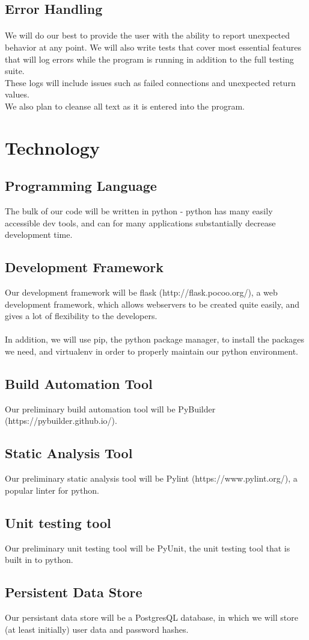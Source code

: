\documentclass{article}
\begin{document}
\subsection{Error Handling}

\paragraph{}

We will do our best to provide the user with the ability to report unexpected behavior at any point. We will also write tests that cover most essential features that will log errors while the program is running in addition to the full testing suite.\\

These logs will include issues such as failed connections and unexpected return values.\\

We also plan to cleanse all text as it is entered into the program.

\newpage
\section{Technology}

\subsection{Programming Language}
The bulk of our code will be written in python - python has many easily accessible dev tools, and can for many applications substantially decrease development time. 
\subsection{Development Framework}
Our development framework will be flask (http://flask.pocoo.org/), a web development framework, which allows webservers to be created quite easily, and gives a lot of flexibility to the developers. \\
\\
In addition, we will use pip, the python package manager, to install the packages we need, and virtualenv in order to properly maintain our python environment. 
\subsection{Build Automation Tool}
Our preliminary build automation tool will be PyBuilder (https://pybuilder.github.io/).
\subsection{Static Analysis Tool}
Our preliminary static analysis tool will be Pylint (https://www.pylint.org/), a popular linter for python.
\subsection{Unit testing tool}
Our preliminary unit testing tool will be PyUnit, the unit testing tool that is built in to python.
\subsection{Persistent Data Store} 
Our persistant data store will be a PostgresQL database, in which we will store (at least initially) user data and password hashes.
\end{document}
